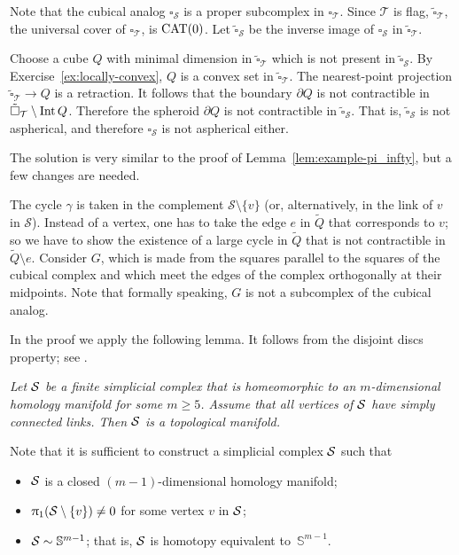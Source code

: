 Note that the cubical analog $\square_{\mathcal{S}}$ is a proper subcomplex in $\square_{\mathcal{T}}$.
Since $\mathcal{T}$ is flag,
$\tilde\square_{\mathcal{T}}$,
the universal cover of $\square_{\mathcal{T}}$, is $\mathrm{CAT}(0)$.
Let $\tilde\square_{\mathcal{S}}$ be the inverse image of $\square_{\mathcal{S}}$ in $\tilde\square_{\mathcal{T}}$.

Choose a cube $Q$ with minimal dimension in $\tilde\square_{\mathcal{T}}$ which is not present in $\tilde\square_{\mathcal{S}}$.
By Exercise~\ref{ex:locally-convex}, $Q$ is a convex set in $\tilde\square_{\mathcal{T}}$.
The nearest-point projection $\tilde\square_{\mathcal{T}}\to Q$ is a retraction.
It follows that the boundary $\partial Q$ is not contractible in $\tilde\square_{\mathcal{T}}\setminus\operatorname{\rm Int}\nolimits Q$.
Therefore the spheroid $\partial Q$ is not contractible in $\tilde\square_{\mathcal{S}}$.
That is, $\tilde\square_{\mathcal{S}}$ is not aspherical, and therefore $\square_{\mathcal{S}}$ is not aspherical either.

The solution is very similar to the proof of Lemma~\ref{lem:example-pi_infty}, but a few changes are needed.

The cycle $\gamma$ is taken in the complement $\mathcal{S}\setminus\{v\}$ (or, alternatively, in the link of $v$ in $\mathcal{S}$).
Instead of a vertex, one has to take the edge $e$ in $\tilde Q$ that corresponds to $v$;
so we have to show the existence of a large cycle in $\tilde Q$ that is not contractible in $\tilde Q\setminus e$.
Consider $G$,
which is made from the squares parallel to the squares of the cubical complex and which meet the edges of the complex orthogonally at their midpoints.
Note that formally speaking, $G$ is not a subcomplex of the cubical analog.




In the proof we apply the following lemma. 
It follows from the disjoint discs property;
see \cite{edwards, daverman}.

\medskip

\textit{Let $\mathcal{S}$ be a finite simplicial complex that
is homeomorphic to an $m$-dimensional homology manifold for some $m\ge 5$.
Assume that all vertices of
$\mathcal{S}$ have simply connected links.
Then $\mathcal{S}$ is a topological manifold.}

\medskip


Note that it is sufficient to construct a simplicial complex $\mathcal{S}$
such that 
\begin{itemize}
\item $\mathcal{S}$ is a closed $(m-1)$-dimensional homology manifold;
\item $\uppi_1(\mathcal{S}\setminus\{v\})\ne0$ for some vertex $v$ in $\mathcal{S}$;
\item $\mathcal{S}\sim \mathbb{S}^{m-1}$; that is, $\mathcal{S}$ is homotopy equivalent to~$\mathbb{S}^{m-1}$.
\end{itemize}

